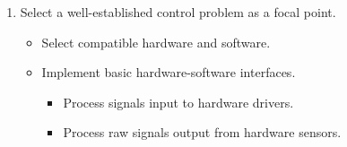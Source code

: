 \documentclass[crop=false,float=true,class=scrreprt]{standalone}
\begin{document}
\begin{enumerate}[leftmargin=*]

\item Select a well-established control problem as a focal point.
\\[-2.0em]
\begin{itemize}[leftmargin=*]

  \item Select compatible hardware and software.
  
  \item Implement basic hardware-software interfaces.
  \begin{itemize}[leftmargin=*, label=$\vcenter{\hbox{\tiny$\bullet$}}$]
    
    \item Process signals input to hardware drivers.
    \item Process raw signals output from hardware sensors.\\[-5.5em]
    \\[-1.0em]
      
  \end{itemize}
  
\end{itemize}



\end{enumerate}
\end{document}
